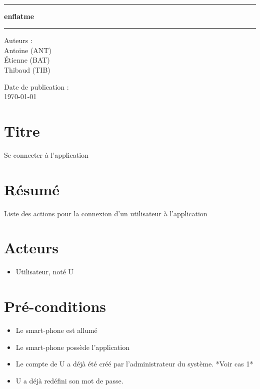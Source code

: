 \documentclass[a4paper, 12pt, french]{article}
\newcommand{\nomProjet}{enflatme\xspace}
\begin{document}
	\begin{titlepage}
		\begin{center}
			\LARGE{} \\
		    \rule{\linewidth}{1.5pt}
		    \huge{\textbf{\nomProjet}}
		    \rule{\linewidth}{1.5pt} \newline{} \newline{}
		\end{center}
		\begin{center}
		    \large{Auteurs :}\\ Antoine  (ANT)\\ Étienne  (BAT) \\ Thibaud  (TIB)
		\end{center}
		\vspace{50px}
		\begin{center}
			\large{Date de publication :}\\ \today
		\end{center}
	\end{titlepage}
	\newpage


\section{Titre}
Se connecter à l'application

\section{Résumé }
Liste des actions pour la connexion d'un utilisateur à l'application 

\section{Acteurs}
\begin{itemize}
	\item Utilisateur, noté U
\end{itemize}

\section{Pré-conditions}

\begin{itemize}
	\item Le smart-phone est allumé
	\item Le smart-phone possède l'application
	\item Le compte de U a déjà été créé par l'administrateur du système. *Voir cas 1*
	\item U a déjà redéfini son mot de passe.
\end{itemize}
\end{document}
